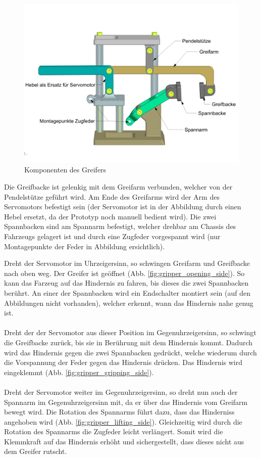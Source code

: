 \begin{figure}[H]
\centering
\includegraphics[width=1.0\linewidth]{assets/greifer-prototyp/Greifer_side_Komponentennamen.png} 
\caption{Komponenten des Greifers}
\label{fig:gripper_components}
\end{figure}

Die Greifbacke ist gelenkig mit dem Greifarm verbunden, welcher von der Pendelstütze geführt wird. Am Ende des Greifarms wird der Arm des Servomotors befestigt sein (der Servomotor ist in der Abbildung durch einen Hebel ersetzt, da der Prototyp noch manuell bedient wird). Die zwei Spannbacken sind am Spannarm befestigt, welcher drehbar am Chassis des Fahrzeugs gelagert ist und durch eine Zugfeder vorgespannt wird (nur Montagepunkte der Feder in Abbildung ersichtlich).

\newpage

Dreht der Servomotor im Uhrzeigersinn, so schwingen Greifarm und Greifbacke nach oben weg. Der Greifer ist geöffnet (Abb. \ref{fig:gripper_opening_side}). So kann das Farzeug auf das Hindernis zu fahren, bis dieses die zwei Spannbacken berührt. An einer der Spannbacken wird ein Endschalter montiert sein (auf den Abbildungen nicht vorhanden), welcher erkennt, wann das Hindernis nahe genug ist.\\
\\
Dreht der der Servomotor aus dieser Position im Gegenuhrzeigersinn, so schwingt die Greifbacke zurück, bis sie in Berührung mit dem Hindernis kommt. Dadurch wird das Hindernis gegen die zwei Spannbacken gedrückt, welche wiederum durch die Vorspannung der Feder gegen das Hindernis drücken. Das Hindernis wird eingeklemmt (Abb. \ref{fig:gripper_gripping_side}).\\
\\
Dreht der Servomotor weiter im Gegenuhrzeigersinn, so dreht nun auch der Spannarm im Gegenuhrzeigersinn mit, da er über das Hindernis vom Greifarm bewegt wird. Die Rotation des Spannarms führt dazu, dass das Hinderniss angehoben wird (Abb. \ref{fig:gripper_lifting_side}). Gleichzeitig wird durch die Rotation des Spannarms die Zugfeder leicht verlängert. Somit wird die Klemmkraft auf das Hindernis erhöht und sichergestellt, dass dieses nicht aus dem Greifer rutscht.

